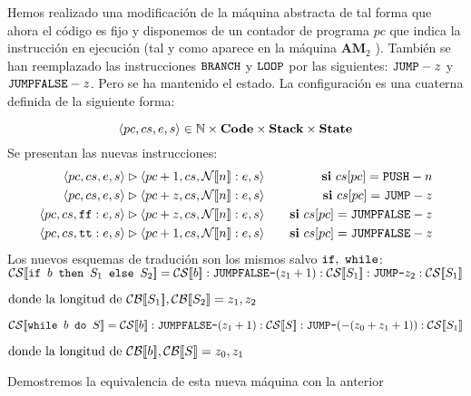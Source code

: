 \begin{example} [ACABAR?]
    Hemos realizado una modificación de la máquina abstracta de tal forma que ahora el código es fijo y disponemos de un contador de programa $pc$ que indica la instrucción en ejecución (tal y como aparece en la máquina $\mathbf{A M}_{2}$ ). También se han reemplazado las instrucciones $\texttt{BRANCH}$ y $\texttt{LOOP}$ por las siguientes: $\texttt{JUMP}-z$
y $\texttt{JUMPFALSE}-z$. Pero se ha mantenido el estado. La configuración es una cuaterna definida de la siguiente forma:

$$ \langle pc, cs , e, s \rangle \in \mathbb{N} \times \mathbf{Code} \times \mathbf{Stack} \times \mathbf{State} $$
Se presentan las nuevas instrucciones:
\begin{eqnarray*}
    \lac{pc}{cs}{e}{s} \rhd \lac{pc+1}{cs}{\fc{N}{n}:e}{s} &\quad& \mathbf{si} \ cs[pc] = \n{PUSH}-n \\
    \lac{pc}{cs}{e}{s} \rhd \lac{pc+z}{cs}{\fc{N}{n}:e}{s} &\quad& \mathbf{si} \ cs[pc] = \n{JUMP}-z \\
    \lac{pc}{cs}{\n{ff}: e}{s} \rhd \lac{pc+z}{cs}{\fc{N}{n}:e}{s} &\quad& \mathbf{si} \ cs[pc] = \n{JUMPFALSE}-z \\
    \lac{pc}{cs}{\n{tt}: e}{s} \rhd \lac{pc+1}{cs}{\fc{N}{n}:e}{s} &\quad& \mathbf{si} \ cs[pc] = \n{JUMPFALSE}-z
\end{eqnarray*}
Los nuevos esquemas de tradución son los mismos salvo $\texttt{if},\  \texttt{while}$:
$ \fc{CS}{\n{if }b\n{ then } S_1 \n{ else }S_2} = \fc{CS}{b}: \n{JUMPFALSE-}(z_1 +1) : \fc{CS}{S_1}:\n{JUMP-}z_2 : \fc{CS}{S_1} $
\begin{center}
    $\text{donde la longitud de }\mathcal{CB}[\![S_1]\!], \mathcal{CB}[\![S_2]\!] = z_1, z_2$
\end{center}
$ \fc{CS}{\n{while }b\n{ do }S} = \fc{CS}{b}: \n{JUMPFALSE-}(z_1 +1) : \fc{CS}{S}:\n{JUMP-}(-(z_0+z_1+1)) : \fc{CS}{S_1} $
\begin{center}
    $\text{donde la longitud de }\mathcal{CB}[\![b]\!], \mathcal{CB}[\![S]\!] = z_0, z_1$
\end{center}
Demostremos la equivalencia de esta nueva máquina con la anterior
\end{example}